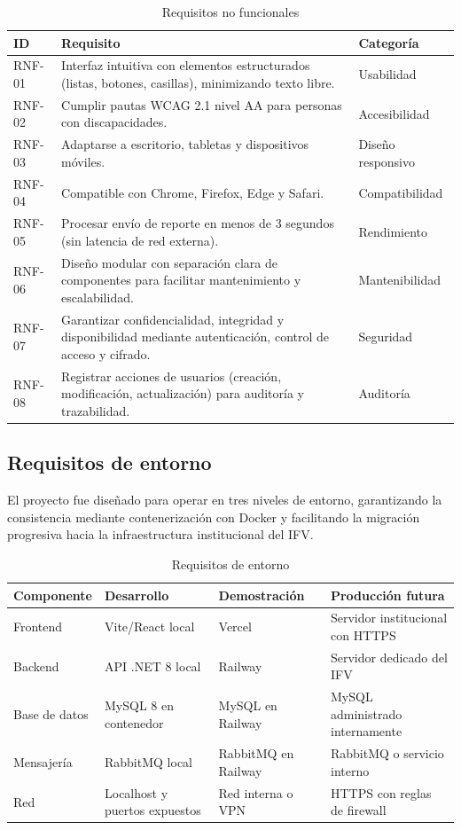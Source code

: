 \documentclass[12pt,letterpaper]{article}
\begin{document}
\begin{table}[H]
\centering
\caption{Requisitos no funcionales}
\label{tab:rnf}
\begin{tabular}{|l|p{8cm}|l|}
\hline
\textbf{ID} & \textbf{Requisito} & \textbf{Categoría} \\
\hline
RNF-01 & Interfaz intuitiva con elementos estructurados (listas, botones, casillas), minimizando texto libre. & Usabilidad \\ \hline
RNF-02 & Cumplir pautas WCAG 2.1 nivel AA para personas con discapacidades. & Accesibilidad \\ \hline
RNF-03 & Adaptarse a escritorio, tabletas y dispositivos móviles. & Diseño responsivo \\ \hline
RNF-04 & Compatible con Chrome, Firefox, Edge y Safari. & Compatibilidad \\ \hline
RNF-05 & Procesar envío de reporte en menos de 3 segundos (sin latencia de red externa). & Rendimiento \\ \hline
RNF-06 & Diseño modular con separación clara de componentes para facilitar mantenimiento y escalabilidad. & Mantenibilidad \\ \hline
RNF-07 & Garantizar confidencialidad, integridad y disponibilidad mediante autenticación, control de acceso y cifrado. & Seguridad \\ \hline
RNF-08 & Registrar acciones de usuarios (creación, modificación, actualización) para auditoría y trazabilidad. & Auditoría \\ \hline
\end{tabular}
\end{table}


\subsection{Requisitos de entorno}

El proyecto fue diseñado para operar en tres niveles de entorno, garantizando la consistencia mediante contenerización con Docker y facilitando la migración progresiva hacia la infraestructura institucional del IFV.

\begin{table}[H]
\centering
\caption{Requisitos de entorno}
\label{tab:entorno}
\begin{tabular}{|l|p{3.5cm}|p{3.5cm}|p{3.5cm}|}
\hline
\textbf{Componente} & \textbf{Desarrollo} & \textbf{Demostración} & \textbf{Producción futura} \\[2pt] \hline
Frontend & Vite/React local & Vercel & Servidor institucional con HTTPS \\ \hline
Backend & API .NET 8 local & Railway & Servidor dedicado del IFV \\ \hline
Base de datos & MySQL 8 en contenedor & MySQL en Railway & MySQL administrado internamente \\ \hline
Mensajería & RabbitMQ local & RabbitMQ en Railway & RabbitMQ o servicio interno \\ \hline
Red & Localhost y puertos expuestos & Red interna o VPN & HTTPS con reglas de firewall \\ \hline
\end{tabular}
\end{table}
\end{document}
